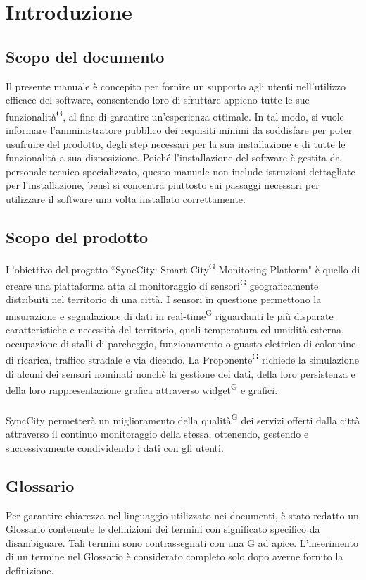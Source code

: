 \documentclass[8pt]{article}
\newcommand{\glossterm}[1]{#1\textsuperscript{G}} %
\begin{document}
\section{Introduzione}\label{sec:intro}
\subsection{Scopo del documento}
Il presente manuale è concepito per fornire un supporto agli utenti nell’utilizzo efficace del software, 
consentendo loro di sfruttare appieno tutte le sue \glossterm{funzionalità}, al fine di garantire un’esperienza ottimale.
In tal modo, si vuole informare l’amministratore pubblico dei requisiti minimi da soddisfare per
poter usufruire del prodotto, degli step necessari per la sua installazione e di tutte le funzionalità a sua disposizione.
 Poiché l’installazione del software è gestita da personale tecnico specializzato, questo
 manuale non include istruzioni dettagliate per l’installazione, bensì si concentra piuttosto sui
 passaggi necessari per utilizzare il software una volta installato correttamente.
\subsection{Scopo del prodotto}
L'obiettivo del progetto ``SyncCity: \glossterm{Smart City} Monitoring Platform" è quello di creare una piattaforma atta al monitoraggio
di \glossterm{sensori} geograficamente distribuiti nel territorio di una città. I sensori in questione
permettono la misurazione e segnalazione di dati in \glossterm{real-time} riguardanti le più disparate
caratteristiche e necessità del territorio, quali temperatura ed umidità esterna, occupazione di
stalli di parcheggio, funzionamento o guasto elettrico di colonnine di ricarica, traffico stradale e via
dicendo. La \glossterm{Proponente} richiede la simulazione di alcuni dei sensori nominati nonchè la
gestione dei dati, della loro persistenza e della loro rappresentazione grafica attraverso \glossterm{widget} e
grafici. 
\\\\SyncCity permetterà un miglioramento della \glossterm{qualità} dei servizi offerti dalla città attraverso il continuo monitoraggio della stessa, ottenendo, gestendo e successivamente condividendo i dati con gli utenti. 
\subsection{Glossario}
Per garantire chiarezza nel linguaggio utilizzato nei documenti, è stato redatto un Glossario contenente le definizioni dei termini con significato specifico da disambiguare. Tali termini sono contrassegnati con una G ad apice. L'inserimento di un termine nel Glossario è considerato completo solo dopo averne fornito la definizione.
\end{document}
